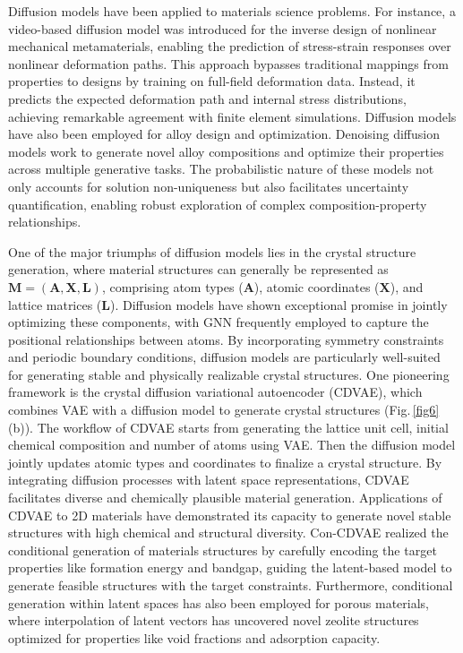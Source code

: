 \documentclass[fleqn,10pt]{wlscirep}
\begin{document}
Diffusion models have been applied to materials science problems. For instance, a video-based diffusion model was introduced for the inverse design of nonlinear mechanical metamaterials, enabling the prediction of stress-strain responses over nonlinear deformation paths. This approach bypasses traditional mappings from properties to designs by training on full-field deformation data. Instead, it predicts the expected deformation path and internal stress distributions, achieving remarkable agreement with finite element simulations\cite{bastek2023inverse}. Diffusion models have also been employed for alloy design and optimization. Denoising diffusion models work to generate novel alloy compositions and optimize their properties across multiple generative tasks. The probabilistic nature of these models not only accounts for solution non-uniqueness but also facilitates uncertainty quantification, enabling robust exploration of complex composition-property relationships\cite{fernandez2024denoising}.

One of the major triumphs of diffusion models lies in the crystal structure generation, where material structures can generally be represented as $\textbf{M} = (\textbf{A}, \textbf{X}, \textbf{L})$, comprising atom types ($\textbf{A}$), atomic coordinates ($\textbf{X}$), and lattice matrices ($\textbf{L}$). Diffusion models have shown exceptional promise in jointly optimizing these components, with GNN frequently employed to capture the positional relationships between atoms\cite{xie2018crystal}. By incorporating symmetry constraints and periodic boundary conditions, diffusion models are particularly well-suited for generating stable and physically realizable crystal structures.
One pioneering framework is the crystal diffusion variational autoencoder (CDVAE), which combines VAE with a diffusion model to generate crystal structures\cite{xie2021crystal} (Fig.\,\ref{fig6}(b)). The workflow of CDVAE starts from generating the lattice unit cell, initial chemical composition and number of atoms using VAE. Then the diffusion model jointly updates atomic types and coordinates to finalize a crystal structure. By integrating diffusion processes with latent space representations, CDVAE facilitates diverse and chemically plausible material generation. Applications of CDVAE to 2D materials have demonstrated its capacity to generate novel stable structures with high chemical and structural diversity\cite{lyngby2022data}. Con-CDVAE realized the conditional generation of materials structures by carefully encoding the target properties like formation energy and bandgap, guiding the latent-based model to generate feasible structures with the target constraints\cite{ye2024cdvae}. Furthermore, conditional generation within latent spaces has also been employed for porous materials, where interpolation of latent vectors has uncovered novel zeolite structures optimized for properties like void fractions and adsorption capacity\cite{park2024inverse}. 
\end{document}
